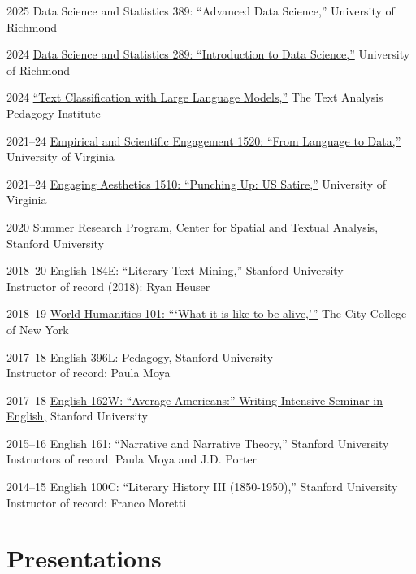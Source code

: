 \documentclass[12pt,letterpaper]{report}
\begin{document}
\begin{tablist}
	\item[2025] \tab{}Data Science and Statistics 389: \enquote{Advanced Data Science,} University of Richmond
	\item[2024] \tab{}\href{https://fredner.org/teaching/#dsst289}{Data Science and Statistics 289: \enquote{Introduction to Data Science,}} University of Richmond
	\item[2024] \tab{}\href{https://fredner.org/teaching/#llm}{\enquote{Text Classification with Large Language Models,}} The Text Analysis Pedagogy Institute
	\item[2021--24] \tab{}\href{https://fredner.org/teaching/#l2d}{Empirical and Scientific Engagement 1520: \enquote{From Language to Data,}} University of Virginia
	\item[2021--24] \tab{}\href{https://fredner.org/teaching/#satire}{Engaging Aesthetics 1510: \enquote{Punching Up: US Satire,}} University of Virginia
	\item[2020] \tab{}Summer Research Program, Center for Spatial and Textual Analysis, Stanford University
	\item[2018--20] \tab{}\href{https://fredner.org/teaching/#ltm}{English 184E: \enquote{Literary Text Mining,}} Stanford University \\
	Instructor of record (2018): Ryan Heuser
	\item[2018--19] \tab{}\href{https://fredner.org/teaching/#whum}{World Humanities 101: \enquote{\enquote{What it is like to be alive,}}} The City College of New York
	\item[2017--18] \tab{}English 396L: Pedagogy, Stanford University \\
	Instructor of record: Paula Moya
	\item[2017--18] \tab{}\href{https://fredner.org/teaching/#avg}{English 162W: \enquote{Average Americans:} Writing Intensive Seminar in English,} Stanford University
	\item[2015--16] \tab{}English 161: \enquote{Narrative and Narrative Theory,} Stanford University \\
	Instructors of record: Paula Moya and J.D. Porter
	\item[2014--15] \tab{}English 100C: \enquote{Literary History III (1850-1950),} Stanford University \\
	Instructor of record: Franco Moretti
\end{tablist}


\section*{Presentations}
\end{document}
